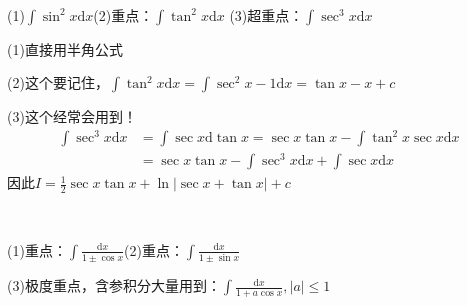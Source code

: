 ~

\begin{exercise}[简单平方]
  (1)$\int \sin^2 x \mathrm{d} x$(2)重点：$\int \tan^2 x\mathrm{d} x$
  (3)超重点：$\int \sec^3 x \mathrm{d} x$
\end{exercise}

\begin{solution}
  (1)直接用半角公式

  (2)这个要记住，$\int \tan^2 x \mathrm{d} x = \int \sec^2 x - 1 \mathrm{d} x = \tan x - x + c$

  (3)这个经常会用到！
  \begin{align*}
    \int \sec^3x \mathrm{d} x &= \int \sec x \mathrm{d} \tan x = \sec x \tan x - \int \tan^2 x \sec x \mathrm{d} x\\
    &= \sec x \tan x - \int \sec^3 x \mathrm{d} x + \int \sec x \mathrm{d} x
  \end{align*}
  因此$I = \frac{1}{2} \sec x \tan x + \ln |\sec x + \tan x| + c$
\end{solution}

~


\begin{exercise}
  (1)重点：$\int \frac{\mathrm{d} x}{1 \pm \cos x}$(2)重点：$\int \frac{\mathrm{d} x}{1 \pm \sin x}$

  (3)极度重点，含参积分大量用到：$\int \frac{\mathrm{d} x}{1 + a\cos x}, |a| \leq 1$
\end{exercise}

